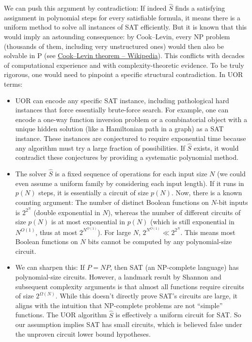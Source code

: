\documentclass[11pt]{article}
\begin{document}
We can push this argument by contradiction: If indeed \(\hat{S}\) finds a satisfying assignment in polynomial steps for every satisfiable formula, it means there is a uniform method to solve all instances of SAT efficiently. But it is known that this would imply an astounding consequence: by Cook--Levin, every NP problem (thousands of them, including very unstructured ones) would then also be solvable in P (see \href{https://en.wikipedia.org/wiki/Cook%E2%80%93Levin_theorem}{Cook--Levin theorem -- Wikipedia}). This conflicts with decades of computational experience and with complexity-theoretic evidence. To be truly rigorous, one would need to pinpoint a specific structural contradiction. In UOR terms:
\begin{itemize}
    \item UOR can encode any specific SAT instance, including pathological hard instances that force essentially brute-force search. For example, one can encode a one-way function inversion problem or a combinatorial object with a unique hidden solution (like a Hamiltonian path in a graph) as a SAT instance. These instances are conjectured to require exponential time because any algorithm must try a large fraction of possibilities. If \(\hat{S}\) exists, it would contradict these conjectures by providing a systematic polynomial method.
    \item The solver \(\hat{S}\) is a fixed sequence of operations for each input size \(N\) (we could even assume a uniform family by considering each input length). If it runs in \(p(N)\) steps, it is essentially a circuit of size \(p(N)\). Now, there is a known counting argument: The number of distinct Boolean functions on \(N\)-bit inputs is \(2^{2^N}\) (double exponential in \(N\)), whereas the number of different circuits of size \(p(N)\) is at most exponential in \(p(N)\) (which is still exponential in \(N^{O(1)}\), thus at most \(2^{N^{O(1)}}\)). For large \(N\), \(2^{N^{O(1)}} \ll 2^{2^N}\). This means most Boolean functions on \(N\) bits cannot be computed by any polynomial-size circuit.
    \item We can sharpen this: If \(P=NP\), then SAT (an NP-complete language) has polynomial-size circuits. However, a landmark result by Shannon and subsequent complexity arguments is that almost all functions require circuits of size \(2^{\Omega(N)}\). While this doesn’t directly prove SAT’s circuits are large, it aligns with the intuition that NP-complete problems are not “simple” functions. The UOR algorithm \(\hat{S}\) is effectively a uniform circuit for SAT. So our assumption implies SAT has small circuits, which is believed false under the unproven circuit lower bound hypotheses.
\end{itemize}
\end{document}
